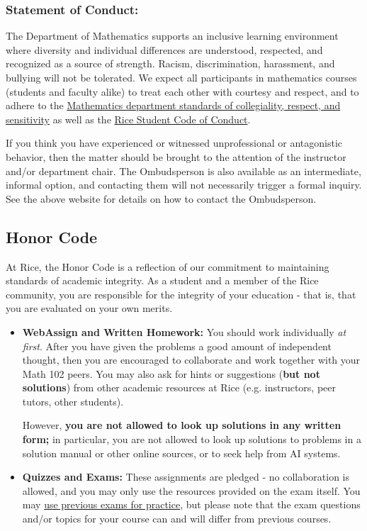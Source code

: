 \documentclass[11pt]{article}
\begin{document}
\subsubsection*{Statement of Conduct:}

The Department of Mathematics supports an inclusive learning environment 
where diversity and individual differences are understood, respected, 
and recognized as a source of strength.   Racism, discrimination, 
harassment, and bullying will not be tolerated.  We expect all 
participants in mathematics courses (students and faculty alike) to 
treat each other with courtesy and respect, and to adhere to the
    \href{https://mathweb.rice.edu/department-statement-collegiality-respect-and-sensitivity}{Mathematics department standards of collegiality,  respect, and  sensitivity} as well as the \href{https://sjp.rice.edu/code-of-student-conduct}{Rice Student Code of Conduct}. 

If you think you have experienced or witnessed unprofessional 
or antagonistic behavior, then the matter should be
brought to the attention of the instructor and/or department chair.   
The Ombudsperson is also available as an intermediate, informal 
option, and contacting them will not necessarily trigger a formal 
inquiry.  See the above website for details on how to contact the Ombudsperson.


\subsection*{Honor Code}

At Rice, the Honor Code is a reflection of our commitment to maintaining standards of academic integrity.  As a student and a member of the Rice community, you are responsible for the integrity of your education - that is, that you are evaluated on your own merits.

\begin{itemize}
    \item \textbf{WebAssign and Written Homework:} You should work individually \emph{at first}. After you have given the problems a good amount of independent thought, then you are encouraged to collaborate and work together with your Math 102 peers.  You may also ask for hints or suggestions (\textbf{but not solutions}) from other academic resources at Rice (e.g. instructors, peer tutors, other students). 

However, \textbf{you are not allowed to look up solutions in any written form;} in particular, you are not allowed to look up solutions to problems in a solution manual or other online sources, or to seek help from AI systems.  
    \item \textbf{Quizzes and Exams:}  These assignments are pledged - no collaboration is allowed, and you may only use the resources provided on the exam itself.  You may \href{https://mathweb.rice.edu/exam-help}{use previous exams for practice}, but please note that the exam questions and/or topics for your course can and will differ from previous courses.
\end{itemize}
\end{document}
